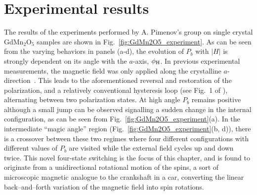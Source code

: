 \section{Experimental results}
\begin{figure*}[t]
    \centering
\caption{ \label{fig:GdMn2O5_experiment} {\bf Experimental measurements of the electric polarization.} (a) At higher temperatures only a small step is seen at the transition that shows some hysteresis and the two-state switching; (b) 4-state switching starts to appear approximately from $T=5$~K.(c) four-state hysteresis loop is clearly seen at $T=2.3$~K with the magnetic field at the ``magic'' angle;  
(d-f) Field dependence of the electric polarization of GdMn$_2$O$_5$ for different off-axis orientations of the applied magnetic field. (d,f): Conventional two-state switching is observed if magnetic field is (d) far away from the ``magic" direction  or (f) very close to the crystallographic $a$-axis. (e,g): Unusual four-state hysteresis loop for the magnetic field direction close to the magic angle of $\pm 9^o$. The inset shows the sequence of the magnetic field-sweeps. The labels 1-4 mark the four polarization states. The arrows show the direction of magnetic field-change during the sweep. The experiments have been done at $T=2.3$\,K. }
\end{figure*}
The results of the experiments performed by A. Pimenov's group on single crystal GdMn$_2$O$_5$ samples are shown in Fig.~\ref{fig:GdMn2O5_experiment}. As can be seen from the varying behaviors in panels (a-d), the evolution of $P_b$ with $|H|$ is strongly dependent on its angle with the $a$-axis, $\phi_{\rm H}$.
In previous experimental measurements, the magnetic field was only applied along the crystalline $a$-direction~\cite{Lee13}.
This leads to the aforementioned reversal and restoration of the polarization, and a relatively conventional hysteresis loop (see Fig.~1 of \cite{Lee13}), alternating between two polarization states.
At high angle $P_b$ remains positive although a small jump can be observed signalling a sudden change in the internal configuration, as can be seen from Fig.~\ref{fig:GdMn2O5_experiment}(a).
In the intermediate ``magic angle'' region (Fig.~\ref{fig:GdMn2O5_experiment}(b, d)), there is a crossover between these two regimes  where four different configurations with different values of $P_b$ are visited while the external field cycles up and down twice.
This novel four-state switching is the focus of this chapter, and is found to originate from a unidirectional rotational motion of the spins, a sort of microscopic magnetic analogue to the crankshaft in a car, converting the linear back--and--forth variation of the magnetic field into spin rotations.
